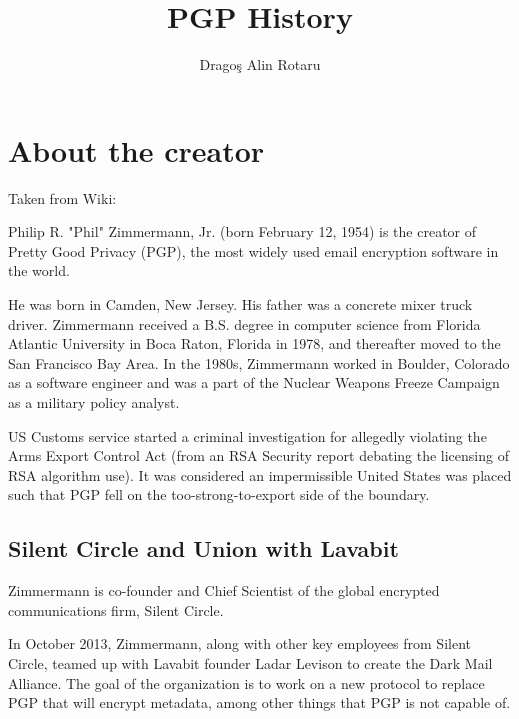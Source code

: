 \documentclass{llncs}
\begin{document}
\pagestyle{plain}
%
\frontmatter          %
%
\pagestyle{headings}  %
\author{Drago\c{s} Alin Rotaru}
%
\title{PGP History}
%
%
\maketitle              %


\section{About the creator}

Taken from Wiki:

Philip R. "Phil" Zimmermann, Jr. (born February 12, 1954) is the creator of Pretty Good Privacy (PGP), the most widely used email encryption software in the world.

He was born in Camden, New Jersey. His father was a concrete mixer truck driver. Zimmermann received a B.S. degree in computer science from Florida Atlantic University in Boca Raton, Florida in 1978, and thereafter moved to the San Francisco Bay Area. In the 1980s, Zimmermann worked in Boulder, Colorado as a software engineer and was a part of the Nuclear Weapons Freeze Campaign as a military policy analyst.

US Customs service started a criminal investigation for allegedly violating the Arms Export Control Act (from an RSA Security report debating the licensing of RSA algorithm use). It was considered an impermissible United States was placed such that PGP fell on the too-strong-to-export side of the boundary.

\subsection{Silent Circle and Union with Lavabit}
Zimmermann is co-founder and Chief Scientist of the global encrypted communications firm, Silent Circle.

In October 2013, Zimmermann, along with other key employees from Silent Circle, teamed up with Lavabit founder Ladar Levison to create the Dark Mail Alliance. The goal of the organization is to work on a new protocol to replace PGP that will encrypt metadata, among other things that PGP is not capable of.
\end{document}

